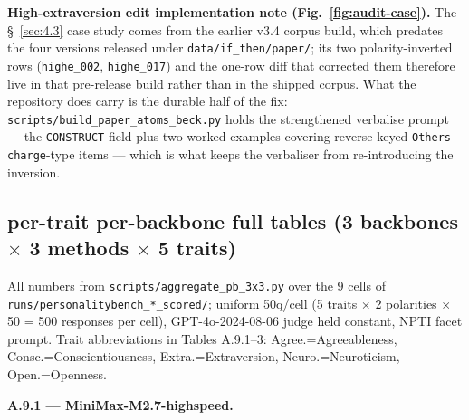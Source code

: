 \textbf{High-extraversion edit implementation note (Fig.~\ref{fig:audit-case}).} The \S~\ref{sec:4.3} case study comes from the earlier v3.4 corpus build, which predates the four versions released under \texttt{data/\allowbreak{}if\_\allowbreak{}then/\allowbreak{}paper/\allowbreak{}}; its two polarity-inverted rows (\texttt{highe\_\allowbreak{}002}, \texttt{highe\_\allowbreak{}017}) and the one-row diff that corrected them therefore live in that pre-release build rather than in the shipped corpus. What the repository does carry is the durable half of the fix: \texttt{scripts/\allowbreak{}build\_\allowbreak{}paper\_\allowbreak{}atoms\_\allowbreak{}beck.py} holds the strengthened verbalise prompt --- the \texttt{CONSTRUCT} field plus two worked examples covering reverse-keyed \texttt{Others charge}-type items --- which is what keeps the verbaliser from re-introducing the inversion.

\subsection{per-trait per-backbone full tables (3 backbones $\times$ 3 methods $\times$ 5 traits)}
\label{app:A.9}

All numbers from \texttt{scripts/\allowbreak{}aggregate\_\allowbreak{}pb\_\allowbreak{}3x3.py} over the 9 cells of \texttt{runs/\allowbreak{}personalitybench\_\allowbreak{}*\_\allowbreak{}scored/\allowbreak{}}; uniform 50q/cell (5 traits $\times$ 2 polarities $\times$ 50 = 500 responses per cell), GPT-4o-2024-08-06 judge held constant, NPTI facet prompt. Trait abbreviations in Tables A.9.1--3: Agree.=Agreeableness, Consc.=Conscientiousness, Extra.=Extraversion, Neuro.=Neuroticism, Open.=Openness.

\label{app:A.9.1}
\textbf{A.9.1 --- MiniMax-M2.7-highspeed.}


\begin{table}[t]
\centering
{}
\caption{PersonalityBench per-trait scores on MiniMax-M2.7-highspeed under CAPS, the NPTI Simple-Prompt (SP) baseline, and the NPTI $P^{\!2}$ paragraph baseline (both verbatim from \citet{NPTI}); uniform GPT-4o-2024-08-06 judge, 50 questions per (trait $\times$ polarity) cell.}
\label{tab:pb-mm}
\end{table}

